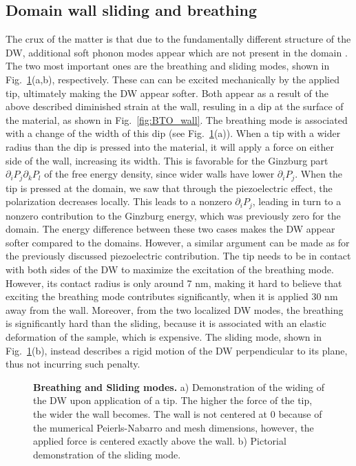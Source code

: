 \subsection{Domain wall sliding and breathing}
The crux of the matter is that due to the fundamentally different structure of the DW, additional soft phonon modes appear which are not present in the domain \cite{Chen2020}.
The two most important ones are the breathing and sliding modes, shown in Fig.~\ref{fig:BTO_breathing_sliding}(a,b), respectively.
These can can be excited mechanically by the applied tip, ultimately making the DW appear softer.
Both appear as a result of the above described diminished strain at the wall, resuling in a dip at the surface of the material, as shown in Fig.~\ref{fig:BTO_wall}.
The breathing mode is associated with a change of the width of this dip (see Fig.~\ref{fig:BTO_breathing_sliding}(a)).
When a tip with a wider radius than the dip is pressed into the material, it will apply a force on either side of the wall, increasing its width.
This is favorable for the Ginzburg part $\partial_i P_j \partial_k P_l$ of the free energy density, since wider walls have lower $\partial_i P_j$.
When the tip is pressed at the domain, we saw that through the piezoelectric effect, the polarization decreases locally.
This leads to a nonzero $\partial_i P_j$, leading in turn to a nonzero contribution to the Ginzburg energy, which was previously zero for the domain.
The energy difference between these two cases makes the DW appear softer compared to the domains.
However, a similar argument can be made as for the previously discussed piezoelectric contribution.
The tip needs to be in contact with both sides of the DW to maximize the excitation of the breathing mode.
However, its contact radius is only around 7 nm, making it hard to believe that exciting the breathing mode contributes significantly, when it is applied 30 nm away from the wall.
Moreover, from the two localized DW modes, the breathing is significantly hard than the sliding, because it is associated with an elastic deformation of the sample, which is expensive.
The sliding mode, shown in Fig.~\ref{fig:BTO_breathing_sliding}(b), instead describes a rigid motion of the DW perpendicular to its plane, thus not incurring such penalty. 

\begin{figure}
	\caption{\label{fig:BTO_breathing_sliding}{\bf Breathing and Sliding modes.} a) Demonstration of the widing of the DW upon application of a tip. The higher the force of the tip, the wider the wall becomes. The wall is not centered at 0 because of the mumerical Peierls-Nabarro and mesh dimensions, however, the applied force is centered exactly above the wall. b) Pictorial demonstration of the sliding mode.}
\end{figure}

